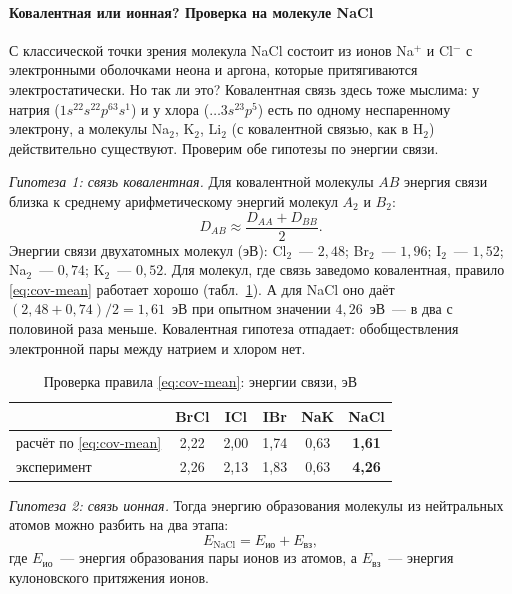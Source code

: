 \paragraph{Ковалентная или ионная? Проверка на молекуле NaCl}
С классической точки зрения молекула NaCl состоит из ионов Na$^+$ и
Cl$^-$ с электронными оболочками неона и аргона, которые притягиваются
электростатически. Но так ли это? Ковалентная связь здесь тоже мыслима:
у натрия ($1s^22s^22p^63s^1$) и у хлора ($\ldots3s^23p^5$) есть по одному
неспаренному электрону, а молекулы Na$_2$, K$_2$, Li$_2$ (с ковалентной
связью, как в H$_2$) действительно существуют. Проверим обе гипотезы по
энергии связи.

\emph{Гипотеза 1: связь ковалентная.} Для ковалентной молекулы $AB$
энергия связи близка к среднему арифметическому энергий молекул $A_2$ и
$B_2$:
\begin{equation}\label{eq:cov-mean}
D_{AB}\approx\frac{D_{AA}+D_{BB}}2 .
\end{equation}
Энергии связи двухатомных молекул (эВ): Cl$_2$~— $2{,}48$; Br$_2$~—
$1{,}96$; I$_2$~— $1{,}52$; Na$_2$~— $0{,}74$; K$_2$~— $0{,}52$. Для
молекул, где связь заведомо ковалентная, правило \eqref{eq:cov-mean}
работает хорошо (табл.~\ref{tab:cov-check}). А для NaCl оно даёт
$(2{,}48+0{,}74)/2=1{,}61$~эВ при опытном значении
$4{,}26$~эВ~— в два с половиной раза меньше. Ковалентная гипотеза
отпадает: обобществления электронной пары между натрием и хлором нет.

\begin{table}[ht]
\centering
\caption{Проверка правила \eqref{eq:cov-mean}: энергии связи, эВ}
\label{tab:cov-check}
\small
\begin{tabular}{@{}lccccc@{}}
\toprule
 & BrCl & ICl & IBr & NaK & \textbf{NaCl} \\
\midrule
расчёт по \eqref{eq:cov-mean} & 2,22 & 2,00 & 1,74 & 0,63 & \textbf{1,61} \\
эксперимент & 2,26 & 2,13 & 1,83 & 0,63 & \textbf{4,26} \\
\bottomrule
\end{tabular}
\end{table}

\emph{Гипотеза 2: связь ионная.} Тогда энергию образования молекулы из
нейтральных атомов можно разбить на два этапа:
\begin{equation}\label{eq:E-ionic}
E_\text{NaCl}=E_\text{ио}+E_\text{вз},
\end{equation}
где $E_\text{ио}$~— энергия образования пары ионов из атомов, а
$E_\text{вз}$~— энергия кулоновского притяжения ионов.

